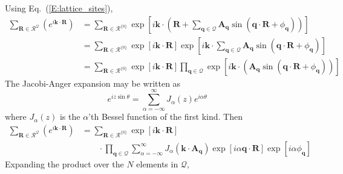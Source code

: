 \documentclass[12pt]{article}
\begin{document}
Using Eq.~(\ref{E:lattice_sites}),
\begin{align*}
    \sum_{\mathbf{R}\in\mathcal{R}^{\mathcal{Q}}}\left( e^{i\mathbf{k}\cdot\mathbf{R}} \right) 
        &= \sum_{\mathbf{R}\in\mathcal{R}^{\{0\}}} \exp\left[i\mathbf{k}\cdot\left(\mathbf{R} 
         + \sum_{\mathbf{q}\in\mathcal{Q}}\mathbf{A}_{\mathbf{q}}\sin\left(\mathbf{q}\cdot\mathbf{R}+\phi_{\mathbf{q}}\right)\right)\right] \\
        &= \sum_{\mathbf{R}\in\mathcal{R}^{\{0\}}} \exp\left[i\mathbf{k}\cdot\mathbf{R}\right] \exp\left[i\mathbf{k}\cdot\sum_{\mathbf{q}\in\mathcal{Q}}\mathbf{A}_{\mathbf{q}}\sin\left(\mathbf{q}\cdot\mathbf{R}+\phi_{\mathbf{q}}\right)\right]\\
        &= \sum_{\mathbf{R}\in\mathcal{R}^{\{0\}}} \exp\left[i\mathbf{k}\cdot\mathbf{R}\right] \prod_{\mathbf{q}\in\mathcal{Q}}\exp\left[i\mathbf{k}\cdot\left(\mathbf{A}_{\mathbf{q}}\sin\left(\mathbf{q}\cdot\mathbf{R}+\phi_{\mathbf{q}}\right)\right)\right]
\end{align*}
The Jacobi-Anger expansion may be written as
\begin{equation*}
    e^{iz\sin\theta} = \sum_{\alpha=-\infty}^{\infty}J_\alpha(z)e^{i\alpha\theta}
\end{equation*}
where $J_\alpha(z)$ is the $\alpha$'th Bessel function of the first kind.  Then
\begin{align*}
    \sum_{\mathbf{R}\in\mathcal{R}^{\mathcal{Q}}}\left( e^{i\mathbf{k}\cdot\mathbf{R}} \right) 
        &= \sum_{\mathbf{R}\in\mathcal{R}^{\{0\}}} \exp\left[i\mathbf{k}\cdot\mathbf{R}\right] \nonumber \\
        & \qquad \cdot\prod_{\mathbf{q}\in\mathcal{Q}} \sum_{\alpha=-\infty}^{\infty}J_\alpha\left(\mathbf{k}\cdot\mathbf{A}_{\mathbf{q}}\right) \exp\left[i\alpha\mathbf{q}\cdot\mathbf{R}\right]\exp\left[i\alpha\phi_{\mathbf{q}}\right]
\end{align*}
Expanding the product over the $N$ elements in $\mathcal{Q}$,
\end{document}
